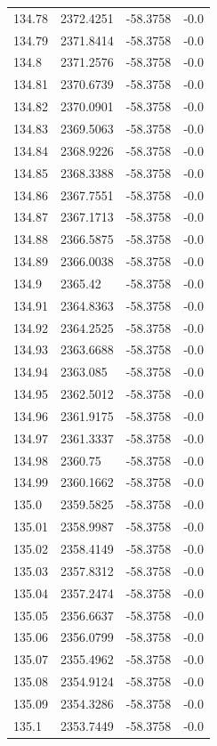 \begin{table}[H]
\begin{tabular}{llll}
134.78 & 2372.4251 & -58.3758 & -0.0 \\
134.79 & 2371.8414 & -58.3758 & -0.0 \\
134.8 & 2371.2576 & -58.3758 & -0.0 \\
134.81 & 2370.6739 & -58.3758 & -0.0 \\
134.82 & 2370.0901 & -58.3758 & -0.0 \\
134.83 & 2369.5063 & -58.3758 & -0.0 \\
134.84 & 2368.9226 & -58.3758 & -0.0 \\
134.85 & 2368.3388 & -58.3758 & -0.0 \\
134.86 & 2367.7551 & -58.3758 & -0.0 \\
134.87 & 2367.1713 & -58.3758 & -0.0 \\
134.88 & 2366.5875 & -58.3758 & -0.0 \\
134.89 & 2366.0038 & -58.3758 & -0.0 \\
134.9 & 2365.42 & -58.3758 & -0.0 \\
134.91 & 2364.8363 & -58.3758 & -0.0 \\
134.92 & 2364.2525 & -58.3758 & -0.0 \\
134.93 & 2363.6688 & -58.3758 & -0.0 \\
134.94 & 2363.085 & -58.3758 & -0.0 \\
134.95 & 2362.5012 & -58.3758 & -0.0 \\
134.96 & 2361.9175 & -58.3758 & -0.0 \\
134.97 & 2361.3337 & -58.3758 & -0.0 \\
134.98 & 2360.75 & -58.3758 & -0.0 \\
134.99 & 2360.1662 & -58.3758 & -0.0 \\
135.0 & 2359.5825 & -58.3758 & -0.0 \\
135.01 & 2358.9987 & -58.3758 & -0.0 \\
135.02 & 2358.4149 & -58.3758 & -0.0 \\
135.03 & 2357.8312 & -58.3758 & -0.0 \\
135.04 & 2357.2474 & -58.3758 & -0.0 \\
135.05 & 2356.6637 & -58.3758 & -0.0 \\
135.06 & 2356.0799 & -58.3758 & -0.0 \\
135.07 & 2355.4962 & -58.3758 & -0.0 \\
135.08 & 2354.9124 & -58.3758 & -0.0 \\
135.09 & 2354.3286 & -58.3758 & -0.0 \\
135.1 & 2353.7449 & -58.3758 & -0.0 \\

\end{tabular}
\end{table}
